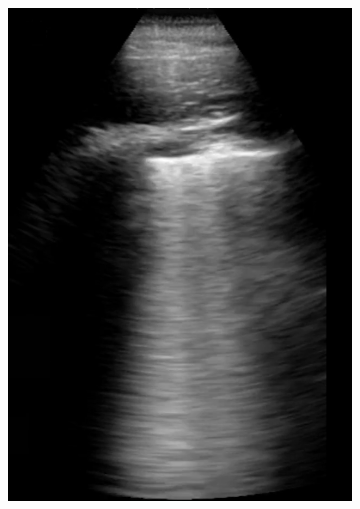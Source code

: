 \documentclass[11pt]{article} %
\begin{document}
\begin{figure}
\begin{subfigure}{0.25\textwidth}
		\includegraphics[width=\textwidth]{figuras/frame2.png}
		\end{subfigure}
		\begin{subfigure}{0.25\textwidth}

\end{subfigure}
\end{figure}
\end{document}
